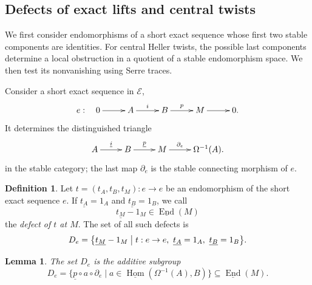 \documentclass[a4paper,11pt,reqno]{amsart}
\newtheorem{lemma}[lemma]{Lemma}
\theoremstyle{definition}
\newtheorem{definition}[definition]{Definition}
\theoremstyle{plain}
\numberwithin{equation}{section}
\newcommand{\Hom}{\operatorname{Hom}}
\newcommand{\End}{\operatorname{End}}
\begin{document}
\subsection{Defects of exact lifts and central twists}

We first consider endomorphisms of a short exact sequence whose first two
stable components are identities.  For central Heller twists, the possible
last components determine a local obstruction in a quotient of a stable
endomorphism space.  We then test its nonvanishing using Serre traces.

Consider a short exact sequence in \(\mathcal E\),
\begin{equation*}
\xymatrix@C=2.2pc{
e:\quad0\ar[r]&A\ar[r]^-{i}&B\ar[r]^-{p}&M\ar[r]&0.
}
\end{equation*}
It determines the distinguished
triangle
\begin{equation}
\label{eq:stable-triangle-of-short-exact-sequence}
\xymatrix@C=2.1pc{
A\ar[r]^-{\underline i}&B\ar[r]^-{\underline p}&M\ar[r]^-{\partial_e}&\Omega^{-1}(A).
}
\end{equation}
in the stable category; the last map \(\partial_e\) is the stable connecting
morphism of \(e\).

\begin{definition}
\label{def:endpoint-defect}
Let \(t=(t_A,t_B,t_M):e\to e\) be an endomorphism of the short exact
sequence \(e\).  If \(\underline{t_A}=1_A\) and
\(\underline{t_B}=1_B\), we call
\[
 \underline{t_M}-1_M\in\underline{\End}(M)
\]
the \emph{defect of \(t\) at \(M\)}.  The set of all such defects is
\[
 D_e=\bigl\{\underline{t_M}-1_M\bigm|
 t:e\to e,\ \underline{t_A}=1_A,\ \underline{t_B}=1_B\bigr\}.
\]
\end{definition}

\begin{lemma}
\label{lem:endpoint-defect}
The set \(D_e\) is the additive subgroup
\begin{equation}
\label{eq:endpoint-defect-subgroup}
 D_e=
 \bigl\{
 \underline p\circ a\circ\partial_e
 \mid
 a\in\underline{\Hom}(\Omega^{-1}(A),B)
 \bigr\}
 \subseteq\underline{\End}(M).
\end{equation}
\end{lemma}
\end{document}
